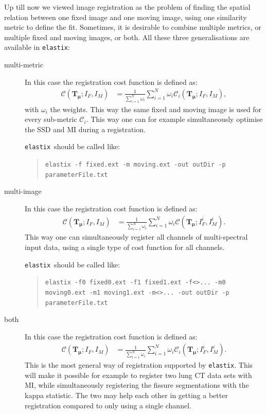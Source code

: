 \documentclass[]{report}
\newcommand{\elastix}{\texttt{elastix}}
\newcommand{\vmu}{\bm{\mu}}
\newcommand{\vTm}{\bm{T}_{\vmu}}
\newcommand{\CC}{\mathcal{C}}
\begin{document}
Up till now we viewed image registration as the problem of finding
the spatial relation between one fixed image and one moving image,
using one similarity metric to define the fit. Sometimes, it is
desirable to combine multiple metrics, or multiple fixed and moving
images, or both. All these three generalisations are available in \elastix:
\begin{description}
\item[multi-metric] In this case the registration cost function is defined
as:
\begin{align}
\CC(\vTm; I_F, I_M) &= \frac{1}{\sum_{i=1}^N \omega_i} \sum_{i=1}^N
\omega_i \CC_i(\vTm; I_F, I_M),
\end{align}
with $\omega_i$ the weights. This way the same fixed and moving
image is used for every sub-metric $\CC_i$. This way one can for
example simultaneously optimise the SSD and MI during a
registration.

\elastix\ should be called like:
\begin{quote}
\texttt{elastix -f fixed.ext -m moving.ext -out outDir -p parameterFile.txt}
\end{quote}

\item[multi-image] In this case the registration cost function is defined
as:
\begin{align}
\CC(\vTm; I_F, I_M) &= \frac{1}{\sum_{i=1}^N \omega_i} \sum_{i=1}^N
\omega_i \CC(\vTm; I_F^i, I_M^i).
\end{align}
This way one can simultaneously register all channels of
multi-spectral input data, using a single type of cost function for
all channels.

\elastix\ should be called like:
\begin{quote}
\texttt{elastix -f0 fixed0.ext -f1 fixed1.ext -f<>... -m0
moving0.ext
 -m1 moving1.ext -m<>... -out outDir -p parameterFile.txt}
\end{quote}

\item[both] In this case the registration cost function is defined
as:
\begin{align}
\CC(\vTm; I_F, I_M) &= \frac{1}{\sum_{i=1}^N \omega_i} \sum_{i=1}^N
\omega_i \CC_i(\vTm; I_F^i, I_M^i).
\end{align}
This is the most general way of registration supported by \elastix.
This will make it possible for example to register two lung CT data
sets with MI, while simultaneously registering the fissure
segmentations with the kappa statistic. The two may help each other
in getting a better registration compared to only using a single channel.
\end{description}
\end{document}
